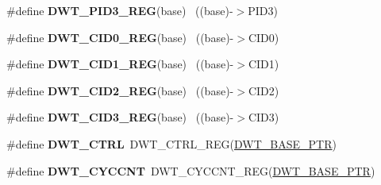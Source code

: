 \begin{DoxyCompactItemize}
\item 
\hypertarget{group___d_w_t___register___accessor___macros_ga0cbc2af1666ca376f4593b2ee568ea1a}{}\#define {\bfseries D\+W\+T\+\_\+\+P\+I\+D3\+\_\+\+R\+E\+G}(base)                                          ~((base)-\/$>$P\+I\+D3)\label{group___d_w_t___register___accessor___macros_ga0cbc2af1666ca376f4593b2ee568ea1a}

\item 
\hypertarget{group___d_w_t___register___accessor___macros_gab77163d0264bc009ac5622e766e24a93}{}\#define {\bfseries D\+W\+T\+\_\+\+C\+I\+D0\+\_\+\+R\+E\+G}(base)                                          ~((base)-\/$>$C\+I\+D0)\label{group___d_w_t___register___accessor___macros_gab77163d0264bc009ac5622e766e24a93}

\item 
\hypertarget{group___d_w_t___register___accessor___macros_ga029e546d2d8949b27c55a4785da019eb}{}\#define {\bfseries D\+W\+T\+\_\+\+C\+I\+D1\+\_\+\+R\+E\+G}(base)                                          ~((base)-\/$>$C\+I\+D1)\label{group___d_w_t___register___accessor___macros_ga029e546d2d8949b27c55a4785da019eb}

\item 
\hypertarget{group___d_w_t___register___accessor___macros_gab6a7a7788e8fdbbe47ac13383064a1e8}{}\#define {\bfseries D\+W\+T\+\_\+\+C\+I\+D2\+\_\+\+R\+E\+G}(base)                                          ~((base)-\/$>$C\+I\+D2)\label{group___d_w_t___register___accessor___macros_gab6a7a7788e8fdbbe47ac13383064a1e8}

\item 
\hypertarget{group___d_w_t___register___accessor___macros_ga7a29c7e2d907c373f1ffa34877e83852}{}\#define {\bfseries D\+W\+T\+\_\+\+C\+I\+D3\+\_\+\+R\+E\+G}(base)                                          ~((base)-\/$>$C\+I\+D3)\label{group___d_w_t___register___accessor___macros_ga7a29c7e2d907c373f1ffa34877e83852}

\item 
\hypertarget{group___d_w_t___register___accessor___macros_ga90b9ebedff8635727698afd2fa84b90a}{}\#define {\bfseries D\+W\+T\+\_\+\+C\+T\+R\+L}~D\+W\+T\+\_\+\+C\+T\+R\+L\+\_\+\+R\+E\+G(\hyperlink{group___d_w_t___peripheral_ga3b46dfb2ea7946c6938028d879c82cb1}{D\+W\+T\+\_\+\+B\+A\+S\+E\+\_\+\+P\+T\+R})\label{group___d_w_t___register___accessor___macros_ga90b9ebedff8635727698afd2fa84b90a}

\item 
\hypertarget{group___d_w_t___register___accessor___macros_ga01aca3c6bc0f9d7b0f524442ded3f37c}{}\#define {\bfseries D\+W\+T\+\_\+\+C\+Y\+C\+C\+N\+T}~D\+W\+T\+\_\+\+C\+Y\+C\+C\+N\+T\+\_\+\+R\+E\+G(\hyperlink{group___d_w_t___peripheral_ga3b46dfb2ea7946c6938028d879c82cb1}{D\+W\+T\+\_\+\+B\+A\+S\+E\+\_\+\+P\+T\+R})\label{group___d_w_t___register___accessor___macros_ga01aca3c6bc0f9d7b0f524442ded3f37c}


\end{DoxyCompactItemize}

